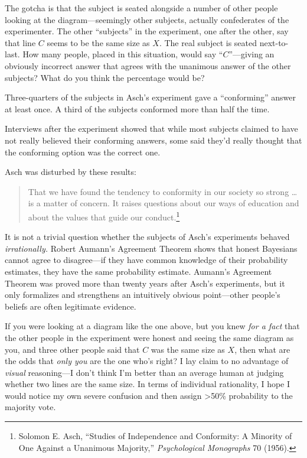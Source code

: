 {
 The gotcha is that the subject is seated alongside a number of
other people looking at the diagram---seemingly other subjects,
actually confederates of the experimenter. The other
``subjects'' in the experiment, one
after the other, say that line $C$ seems to be the same size as $X$. The
real subject is seated next-to-last. How many people, placed in this
situation, would say ``$C$''---giving
an obviously incorrect answer that agrees with the unanimous answer of
the other subjects? What do you think the percentage would be?}

{
 Three-quarters of the subjects in Asch's
experiment gave a ``conforming''
answer at least once. A third of the subjects conformed more than half
the time.}

{
 Interviews after the experiment showed that while most subjects
claimed to have not really believed their conforming answers, some said
they'd really thought that the conforming option was
the correct one.}

{
 Asch was disturbed by these results:}

\begin{quote}
{
 That we have found the tendency to conformity in our society so
strong \ldots is a matter of concern. It raises questions about our ways
of education and about the values that guide our
conduct.\footnote{Solomon E. Asch, ``Studies of Independence and
Conformity: A Minority of One Against a Unanimous
Majority,'' \textit{Psychological Monographs} 70
(1956).}}
\end{quote}

{
 It is not a trivial question whether the subjects of
Asch's experiments behaved \textit{irrationally.}
Robert Aumann's Agreement Theorem shows that honest
Bayesians cannot agree to disagree---if they have common knowledge of
their probability estimates, they have the same probability estimate.
Aumann's Agreement Theorem was proved more than twenty
years after Asch's experiments, but it only formalizes
and strengthens an intuitively obvious point---other
people's beliefs are often legitimate evidence.}

{
 If you were looking at a diagram like the one above, but you knew
\textit{for a fact} that the other people in the experiment were honest
and seeing the same diagram as you, and three other people said that $C$
was the same size as $X$, then what are the odds that \textit{only you}
are the one who's right? I lay claim to no advantage of
\textit{visual} reasoning---I don't think
I'm better than an average human at judging whether two
lines are the same size. In terms of individual rationality, I hope I
would notice my own severe confusion and then assign {\textgreater}50\%
probability to the majority vote.}

